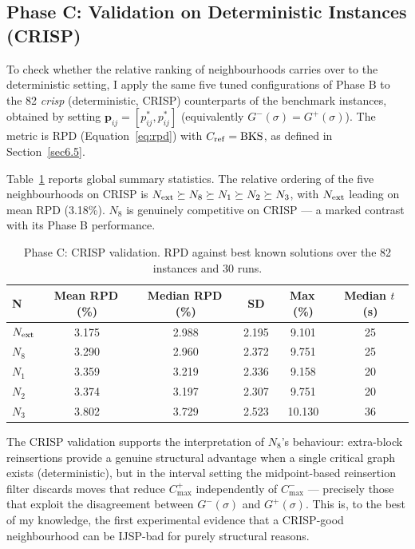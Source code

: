 \documentclass[preprint,12pt]{elsarticle}
\begin{document}
\clearpage
\subsection{Phase C: Validation on Deterministic Instances (CRISP)}
\label{sec6.6}

To check whether the relative ranking of neighbourhoods carries over to the deterministic setting, I apply the same five tuned configurations of Phase B to the 82 \emph{crisp} (deterministic, CRISP) counterparts of the benchmark instances, obtained by setting $\mathbf{p}_{ij} = [p_{ij}^{*}, p_{ij}^{*}]$ (equivalently $G^-(\sigma) = G^+(\sigma)$). The metric is RPD (Equation~\ref{eq:rpd}) with $C_{\rm ref} = \text{BKS}$, as defined in Section~\ref{sec6.5}.

Table~\ref{tab5} reports global summary statistics. The relative ordering of the five neighbourhoods on CRISP is $N_{\rm ext} \succeq N_8 \succeq N_1 \succeq N_2 \succeq N_3$, with $N_{\rm ext}$ leading on mean RPD (3.18\%). $N_8$ is genuinely competitive on CRISP --- a marked contrast with its Phase B performance.

\begin{table}[htbp]
\centering
\caption{Phase C: CRISP validation. RPD against best known solutions over the 82 instances and 30 runs.}
\label{tab5}
\begin{tabular}{l c c c c c}
\hline
N & Mean RPD\,(\%) & Median RPD\,(\%) & SD & Max\,(\%) & Median $t$\,(s) \\
\hline
$N_{\rm ext}$ & 3.175 & 2.988 & 2.195 &  9.101 & 25 \\
$N_8$         & 3.290 & 2.960 & 2.372 &  9.751 & 25 \\
$N_1$         & 3.359 & 3.219 & 2.336 &  9.158 & 20 \\
$N_2$         & 3.374 & 3.197 & 2.307 &  9.751 & 20 \\
$N_3$         & 3.802 & 3.729 & 2.523 & 10.130 & 36 \\
\hline
\end{tabular}
\end{table}

The CRISP validation supports the interpretation of $N_8$'s behaviour: extra-block reinsertions provide a genuine structural advantage when a single critical graph exists (deterministic), but in the interval setting the midpoint-based reinsertion filter discards moves that reduce $C^+_{\max}$ independently of $C^-_{\max}$ --- precisely those that exploit the disagreement between $G^-(\sigma)$ and $G^+(\sigma)$. This is, to the best of my knowledge, the first experimental evidence that a CRISP-good neighbourhood can be IJSP-bad for purely structural reasons.
\end{document}
